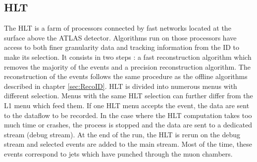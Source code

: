 \subsection{HLT}
\label{sec:org17d9ce6}

The HLT is a farm of processors connected by fast networks located at the surface above the ATLAS detector.
Algorithms run on those processors have access to both finer granularity data and tracking information from the ID to make its selection.
It consists in two steps : a fast reconstruction algorithm which removes the majority of the events and a precision reconstruction algorithm.
The reconstruction of the events follows the same procedure as the offline algorithms described in chapter \ref{sec:RecoID}.
HLT is divided into numerous menus with different selection.
Menus with the same HLT selection can further differ from the L1 menu which feed them.
If one HLT menu accepts the event, the data are sent to the dataflow to be recorded.
In the case where the HLT computation takes too much time or crashes, the process is stopped and the data are sent to a dedicated stream (debug stream).
At the end of the run, the HLT is rerun on the debug stream and selected events are added to the main stream.
Most of the time, these events correspond to jets which have punched through the muon chambers.

